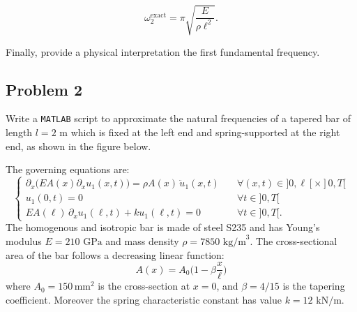 \documentclass[12pt]{article}
\begin{document}
\begin{equation*}
    \omega_2^{\text{exact}} = \pi \sqrt{\frac{E}{\rho \ell^2}}.
\end{equation*}

Finally, provide a physical interpretation the first fundamental frequency.

\subsection*{Problem 2}
Write a \texttt{MATLAB} script to approximate the natural frequencies of a tapered bar of length $l=2\mbox{ m}$ which is fixed at the left end and spring-supported at the right end, as shown in the figure below.
\begin{center}
\end{center}
The governing equations are:
\begin{equation*}
    \begin{cases}
        \partial_{x}\big(EA(x) \partial_{x} u_{1}(x, t)\big) = \rho A(x) \, \ddot{u}_1(x, t) \quad & \forall (x, t) \in ]0, \ell[ \times ]0, T[ \\
        u_1(0, t) = 0 \quad                                                                        & \forall t \in ]0, T[                       \\
        EA(\ell) \, \partial_{x} u_1(\ell, t)+k u_1(\ell,t)= 0 \quad                               & \forall t \in ]0, T[.
    \end{cases}
\end{equation*}
The homogenous and isotropic bar is made of steel S235 and has Young's modulus $E = 210 \mbox{ GPa}$ and mass density $\rho=7850 \mbox{ kg/m}^{3}$.  The cross-sectional area of the bar follows a decreasing linear function:
\[
    A(x) = A_0 \big(1-\beta \frac{x}{\ell}\big)
\]
where \( A_0 = 150 \, \text{mm}^2 \) is the cross-section at \( x = 0 \), and \( \beta = 4/15 \) is the tapering coefficient. Moreover the spring characteristic constant has value $k=12 \mbox{ kN/m}$.
\end{document}
